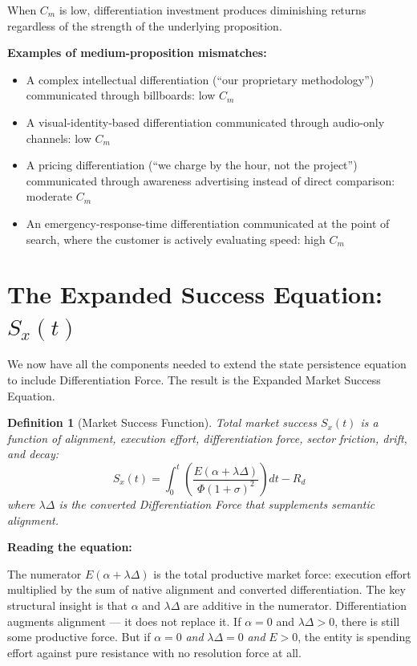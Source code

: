 \documentclass[12pt, openany]{book}
\theoremstyle{thmstyle}
\theoremstyle{defstyle}
\newtheorem{definition}{Definition}[chapter]
\begin{document}
When $C_m$ is low, differentiation investment produces diminishing returns regardless of the strength of the underlying proposition.

\textbf{Examples of medium-proposition mismatches:}
\begin{itemize}[leftmargin=1.5em]
  \item A complex intellectual differentiation (``our proprietary methodology'') communicated through billboards: low $C_m$
  \item A visual-identity-based differentiation communicated through audio-only channels: low $C_m$
  \item A pricing differentiation (``we charge by the hour, not the project'') communicated through awareness advertising instead of direct comparison: moderate $C_m$
  \item An emergency-response-time differentiation communicated at the point of search, where the customer is actively evaluating speed: high $C_m$
\end{itemize}

\section{The Expanded Success Equation: $S_x(t)$}

We now have all the components needed to extend the state persistence equation to include Differentiation Force. The result is the Expanded Market Success Equation.

\begin{definition}[Market Success Function]
Total market success $S_x(t)$ is a function of alignment, execution effort, differentiation force, sector friction, drift, and decay:
\begin{equation}
S_x(t) = \int_0^t \left(\frac{E(\alpha + \lambda\Delta)}{\Phi(1+\sigma)^2}\right) dt - R_d
\label{eq:success}
\end{equation}
where $\lambda\Delta$ is the converted Differentiation Force that supplements semantic alignment.
\end{definition}

\textbf{Reading the equation:}

The numerator $E(\alpha + \lambda\Delta)$ is the total productive market force: execution effort multiplied by the sum of native alignment and converted differentiation. The key structural insight is that $\alpha$ and $\lambda\Delta$ are additive in the numerator. Differentiation augments alignment --- it does not replace it. If $\alpha = 0$ and $\lambda\Delta > 0$, there is still some productive force. But if $\alpha = 0$ \textit{and} $\lambda\Delta = 0$ \textit{and} $E > 0$, the entity is spending effort against pure resistance with no resolution force at all.
\end{document}
